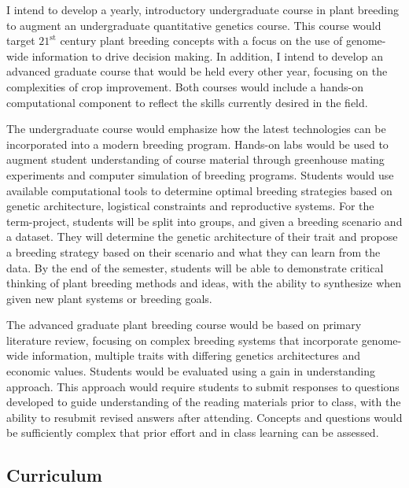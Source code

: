 \documentclass[11pt]{article}
\begin{document}
I intend to develop a yearly, introductory undergraduate course in plant breeding to augment an undergraduate quantitative genetics course. This course would target $21^\text{st}$ century plant breeding concepts with a focus on the use of genome-wide information to drive decision making. In addition, I intend to develop an advanced graduate course that would be held every other year, focusing on the complexities of crop improvement. Both courses would include a hands-on computational component to reflect the skills currently desired in the field.


The undergraduate course would emphasize how the latest technologies can be incorporated into a modern breeding program. Hands-on labs would be used to augment student understanding of course material through greenhouse mating experiments and computer simulation of breeding programs. Students would use available computational tools to determine optimal breeding strategies based on genetic architecture, logistical constraints and reproductive systems. For the term-project, students will be split into groups, and given a breeding scenario and a dataset. They will determine the genetic architecture of their trait and propose a breeding strategy based on their scenario and what they can learn from the data. By the end of the semester, students will be able to demonstrate critical thinking of plant breeding methods and ideas, with the ability to synthesize when given new plant systems or breeding goals. 


The advanced graduate plant breeding course would be based on primary literature review, focusing on complex breeding systems that incorporate genome-wide information, multiple traits with differing genetics architectures and economic values. Students would be evaluated using a gain in understanding approach. This approach would require students to submit responses to questions developed to guide understanding of the reading materials prior to class, with the ability to resubmit revised answers after attending. Concepts and questions would be sufficiently complex that prior effort and in class learning can be assessed.

\subsection*{Curriculum}
\end{document}
